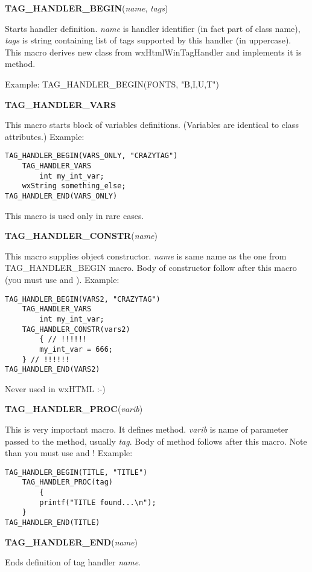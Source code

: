 {\bf TAG\_HANDLER\_BEGIN}({\it name}, {\it tags})

Starts handler definition. {\it name} is handler identifier (in fact
part of class name), {\it tags} is string containing list of tags
supported by this handler (in uppercase). This macro derives new class from
wxHtmlWinTagHandler and implements it is 
 method.

Example: TAG\_HANDLER\_BEGIN(FONTS, "B,I,U,T")

{\bf TAG\_HANDLER\_VARS}

This macro starts block of variables definitions. (Variables are identical
to class attributes.) Example:

\begin{verbatim}
TAG_HANDLER_BEGIN(VARS_ONLY, "CRAZYTAG")
    TAG_HANDLER_VARS
        int my_int_var;
	wxString something_else;
TAG_HANDLER_END(VARS_ONLY)
\end{verbatim}

This macro is used only in rare cases.

{\bf TAG\_HANDLER\_CONSTR}({\it name})

This macro supplies object constructor. {\it name} is same name as the one
from TAG\_HANDLER\_BEGIN macro. Body of constructor follow after
this macro (you must use { and } ). Example:

\begin{verbatim}
TAG_HANDLER_BEGIN(VARS2, "CRAZYTAG")
    TAG_HANDLER_VARS
        int my_int_var;
    TAG_HANDLER_CONSTR(vars2)
        { // !!!!!!
	    my_int_var = 666;
	} // !!!!!!
TAG_HANDLER_END(VARS2)
\end{verbatim}

Never used in wxHTML :-)

{\bf TAG\_HANDLER\_PROC}({\it varib})

This is very important macro. It defines 
method. {\it varib} is name of parameter passed to the method, usually
{\it tag}. Body of method follows after this macro.
Note than you must use { and } ! Example:

\begin{verbatim}
TAG_HANDLER_BEGIN(TITLE, "TITLE")
    TAG_HANDLER_PROC(tag)
        {
	    printf("TITLE found...\n");
	}
TAG_HANDLER_END(TITLE)
\end{verbatim}

{\bf TAG\_HANDLER\_END}({\it name})

Ends definition of tag handler {\it name}. 

